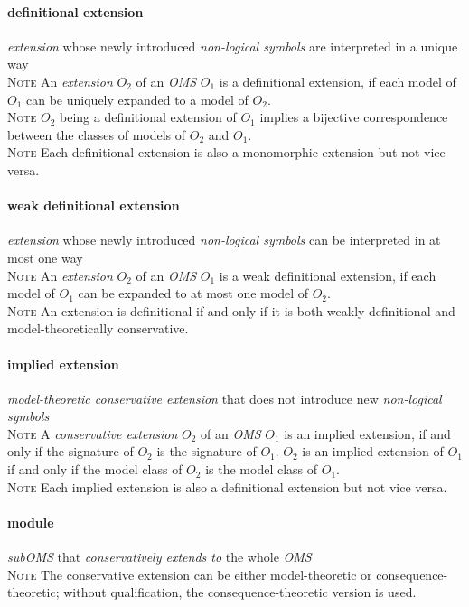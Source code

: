 \documentclass[10pt,%
\ifpretendfinal
final%
\else
draft%
\fi,
]{scrreprt}
\makeatletter
\newcommand*\CommentAuthor{}
\renewcommand*\CommentAuthor{#1}}
\newcommand*\CommentDate{}
\renewcommand*\CommentDate{#1}}
\newcommand*\CommentId{}
\renewcommand*\CommentId{#1}}
\newcommand*\CommentType{}
\renewcommand*\CommentType{#1}}
\newcommand*{\SetCommentColorByType}[1]{%
\edef\localType{{#1}}%
\expandafter\ifstrequal\localType{q-aut}{\colorlet{CommentColor}{red}}{%
\expandafter\ifstrequal\localType{q-all}{\colorlet{CommentColor}{orange}}{%
\expandafter\ifstrequal\localType{todo}{\colorlet{CommentColor}{orange}}{%
\expandafter\ifstrequal\localType{fyi}{\colorlet{CommentColor}{lightgray}}{%
\colorlet{CommentColor}{yellow}}}}}}
\newcommand*{\SetCommentPrefixByType}[1]{%
\edef\localType{{#1}}%
\expandafter\@ifmtarg\localType{%
\edef\CommentPrefix{}%
}{%
\caseupper[q]{#1}%
\edef\CommentPrefix{\thestring: }%
}}
\newcommand*{\initComment}[1]{%
\setkeys{Comment}{#1}%
\SetCommentColorByType{\CommentType}%
\relax%
\SetCommentPrefixByType{\CommentType}%
\relax%
}
\newcommand*{\todonote}[2][]{%
\initComment{#1}%
\pdfcomment[author=\CommentAuthor,color=CommentColor,date=\CommentDate,id=\CommentId]{%
\CommentPrefix
#2}}
\newcommand*{\todonoteURL}[1]{#1}
\renewcommand*{\todonote}[2][]{%
\initComment{#1}%
\ednote{\CommentPrefix #2}}
\renewcommand*{\todonoteURL}[1]{\url{#1}}
\newcommand*{\termref}[1]{\textit{#1}}
\newcommand{\termdefinition}[2]{\paragraph{#1} #2}
\newenvironment{definitions}[0]{\medskip }{}
\newenvironment{note}[0]{\ \\ \textsc{Note} \quad}{}
\makeatother
\begin{document}
\begin{definitions}
  \termdefinition{definitional extension}{\termref{extension} whose newly introduced
   \termref{non-logical symbols} are interpreted in a unique way}
  \begin{note}
An \termref{extension} $O_2$ of an \termref{OMS} $O_1$ is a definitional extension, if each model of $O_1$ can be uniquely expanded to a model of $O_2$.
  \end{note}
  \begin{note}
    $O_2$ being a definitional extension of $O_1$ implies a bijective correspondence between the classes of models of $O_2$ and $O_1$.
  \end{note}
  \begin{note}
    Each definitional extension is also a monomorphic extension but not vice versa.
  \end{note}

  \termdefinition{weak definitional extension}{\termref{extension} whose newly introduced
   \termref{non-logical symbols} can be interpreted in at most one way}
  \begin{note}
An \termref{extension} $O_2$ of an \termref{OMS} $O_1$ is a weak definitional extension, if each model of $O_1$ can be expanded to at most one model of $O_2$.
  \end{note}
  \begin{note}
    An extension is definitional if and only if it is both weakly definitional
   and model-theoretically conservative.
  \end{note}

  \termdefinition{implied extension}{\termref{model-theoretic conservative extension} that does not introduce new \termref{non-logical symbols}}
  \begin{note}
    A \termref{conservative extension} $O_2$ of an \termref{OMS}
    $O_1$ is an implied extension, if and only if the signature of
    $O_2$ is the signature of $O_1$.  $O_2$ is an implied extension of
    $O_1$ if and only if the model class of $O_2$ is the model class
    of $O_1$.
  \end{note}
  \begin{note}
    Each implied extension is also a definitional extension but not vice versa.
  \end{note}

  \termdefinition{module}{\termref{subOMS} that \termref{conservatively extends to} the whole \termref{OMS}}
  \begin{note}
The conservative extension can be either model-theoretic or consequence-theoretic; without
 qualification, the consequence-theoretic version is used.
  \end{note}


\end{definitions}
\end{document}
